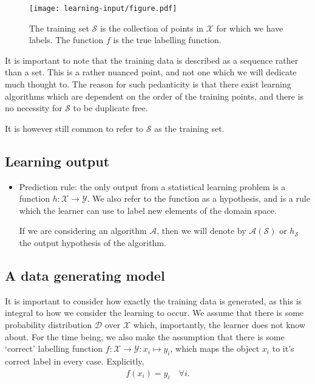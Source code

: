 \begin{figure}[!htb]
	\centering

	\texttt{[image: learning-input/figure.pdf]}
	\caption{The training set $ \mathcal{S} $ is the collection of points in $ \mathcal{X} $ for which we have labels. The function $ f $ is the true labelling function.}

\end{figure}


\begin{remark}
	It is important to note that the training data is described as a sequence rather than a set. This is a rather nuanced point, and not one which we will dedicate much thought to. The reason for such pedanticity is that there exist learning algorithms which are dependent on the order of the training points, and there is no necessity for $ \mathcal{S} $ to be duplicate free.

	It is however still common to refer to $ \mathcal{S} $ as the training set.
\end{remark}

\subsection{Learning output}
\begin{itemize}
	\item Prediction rule: the only output from a statistical learning problem is a function $ h: \mathcal{X} \to \mathcal{Y} $. We also refer to the function as a hypothesis, and is a rule which the learner can use to label new elements of the domain space.

	      If we are considering an algorithm $ \mathcal{A} $, then we will denote by $ \mathcal{A}( \mathcal{S} ) $ or $ h_{\mathcal{S}} $ the output hypothesis of the algorithm.
\end{itemize}

\subsection{A data generating model}
It is important to consider how exactly the training data is generated, as this is integral to how we consider the learning to occur. We assume that there is some probability distribution $ \mathcal{D} $ over $ \mathcal{X} $ which, importantly, the learner does not know about. For the time being, we also make the assumption that there is some `correct' labelling function $ f: \mathcal{X} \to \mathcal{Y}: x_{i} \mapsto y_{i} $, which maps the object $ x_{i} $ to it's correct label in every case. Explicitly,
\begin{align*}
	f ( x_{i} ) = y_{i} \quad \forall i.
\end{align*}

